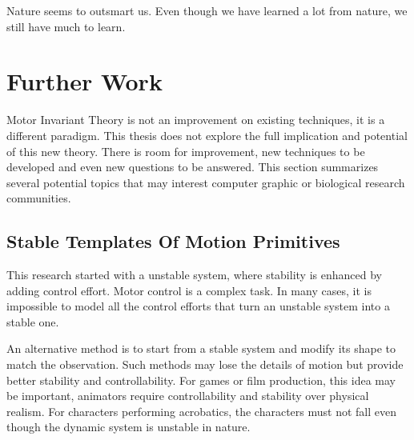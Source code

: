 Nature seems to outsmart us. Even though we have learned a lot from nature,  we still have much to learn.



 




\section{Further Work}
Motor Invariant Theory is not an improvement on existing \cms techniques, it is a different paradigm.
This thesis does not explore the full implication and potential of this new theory.
There is room for improvement, new techniques to be developed and even new questions to be answered.
This section summarizes several potential topics that may interest computer graphic  or biological research communities.

\subsection{Stable Templates Of Motion Primitives}

This research  started with a unstable system,  where stability is enhanced by adding control effort.
Motor control is a complex task. 
In many cases, it is impossible to model all the control efforts that turn an unstable system into a stable one.


An alternative method is to start from a stable system and modify its shape to match the observation.
Such methods may lose the details of motion but provide better stability and controllability. 
For games or film production, this idea may be important, animators require controllability and stability over physical realism.
For characters performing acrobatics, the characters must not fall even though the dynamic system is unstable in nature.




